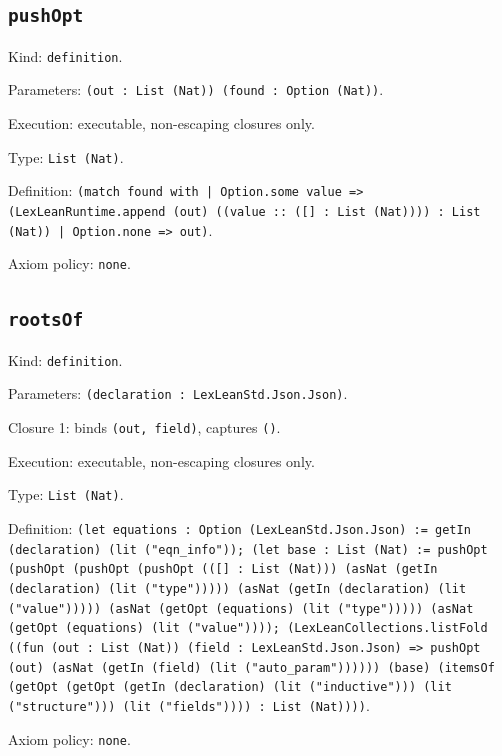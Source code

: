 \documentclass[11pt]{article}
\begin{document}
\subsection*{\texttt{pushOpt}}
\noindent Kind: \texttt{definition}.\par
\noindent Parameters: \texttt{(out : List (Nat)) (found : Option (Nat))}.\par
\noindent Execution: executable, non-escaping closures only.\par
\noindent Type: \texttt{List (Nat)}.\par
\noindent Definition: \texttt{(match found with | Option.some value => (LexLeanRuntime.append (out) ((value :: ([] : List (Nat)))) : List (Nat)) | Option.none => out)}.\par
\noindent Axiom policy: \texttt{none}.\par
\subsection*{\texttt{rootsOf}}
\noindent Kind: \texttt{definition}.\par
\noindent Parameters: \texttt{(declaration : LexLeanStd.Json.Json)}.\par
\noindent Closure 1: binds \texttt{(out, field)}, captures \texttt{()}.\par
\noindent Execution: executable, non-escaping closures only.\par
\noindent Type: \texttt{List (Nat)}.\par
\noindent Definition: \texttt{(let equations : Option (LexLeanStd.Json.Json) := getIn (declaration) (lit ("eqn\_info")); (let base : List (Nat) := pushOpt (pushOpt (pushOpt (pushOpt (([] : List (Nat))) (asNat (getIn (declaration) (lit ("type"))))) (asNat (getIn (declaration) (lit ("value"))))) (asNat (getOpt (equations) (lit ("type"))))) (asNat (getOpt (equations) (lit ("value")))); (LexLeanCollections.listFold ((fun (out : List (Nat)) (field : LexLeanStd.Json.Json) => pushOpt (out) (asNat (getIn (field) (lit ("auto\_param")))))) (base) (itemsOf (getOpt (getOpt (getIn (declaration) (lit ("inductive"))) (lit ("structure"))) (lit ("fields")))) : List (Nat))))}.\par
\noindent Axiom policy: \texttt{none}.\par
\end{document}
